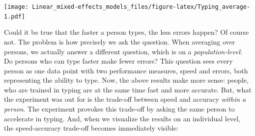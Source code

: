 \documentclass[]{svmono}
\newenvironment{Shaded}{\begin{snugshade}}{\end{snugshade}}
\newcommand{\KeywordTok}[1]{\textcolor[rgb]{0.13,0.29,0.53}{\textbf{#1}}}
\newcommand{\DataTypeTok}[1]{\textcolor[rgb]{0.13,0.29,0.53}{#1}}
\newcommand{\DecValTok}[1]{\textcolor[rgb]{0.00,0.00,0.81}{#1}}
\newcommand{\StringTok}[1]{\textcolor[rgb]{0.31,0.60,0.02}{#1}}
\newcommand{\OtherTok}[1]{\textcolor[rgb]{0.56,0.35,0.01}{#1}}
\newcommand{\OperatorTok}[1]{\textcolor[rgb]{0.81,0.36,0.00}{\textbf{#1}}}
\newcommand{\NormalTok}[1]{#1}
\theoremstyle{definition}
\theoremstyle{definition}
\theoremstyle{definition}
\theoremstyle{remark}
\begin{document}
\begin{Shaded}
\end{Shaded}

\texttt{[image: Linear\_mixed-effects\_models\_files/figure-latex/Typing\_average-1.pdf]}

Could it be true that the faster a person types, the less errors happen?
Of course not. The problem is how precisely we ask the question. When
averaging over persons, we actually answer a different question, which
is on a \emph{population-level}: Do persons who can type faster make
fewer errors? This question sees every person as one data point with two
performance measures, speed and errors, both representing the ability to
type. Now, the above results make more sense: people, who are trained in
typing are at the same time fast and more accurate. But, what the
experiment was out for is the trade-off between speed and accuracy
\emph{within a person}. The experiment provokes this trade-off by asking
the same person to accelerate in typing. And, when we visualize the
results on an individual level, the speed-accuracy trade-off becomes
immediately visible:

\begin{Shaded}
\end{Shaded}
\end{document}
